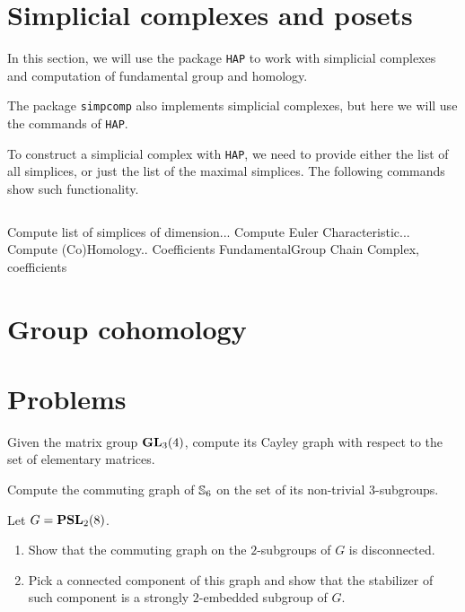 \section{Simplicial complexes and posets}

In this section, we will use the package \texttt{HAP} to work with simplicial complexes and computation of fundamental group and homology.

The package \texttt{simpcomp} also implements simplicial complexes, but here we will use the commands of \texttt{HAP}.

To construct a simplicial complex with \texttt{HAP}, we need to provide either the list of all simplices, or just the list of the maximal simplices.
The following commands show such functionality.

\begin{lstlisting}

\end{lstlisting}

Compute list of simplices of dimension...
Compute Euler Characteristic...
Compute (Co)Homology..
Coefficients
FundamentalGroup
Chain Complex, coefficients


\section{Group cohomology}


\section{Problems}

\begin{prob}
Given the matrix group $\mathbf{GL}_3(4)$, compute its Cayley graph with respect to the set of elementary matrices.
\end{prob}

\begin{prob}
Compute the commuting graph of $\mathbb{S}_6$ on the set of its non-trivial $3$-subgroups.
\end{prob}

\begin{prob}
Let $G = \mathbf{PSL}_2(8)$.
\begin{enumerate}%
    \item Show that the commuting graph on the $2$-subgroups of $G$ is disconnected.
    \item Pick a connected component of this graph and show that the stabilizer of such component is a strongly $2$-embedded subgroup of $G$.
\end{enumerate}
\end{prob}

